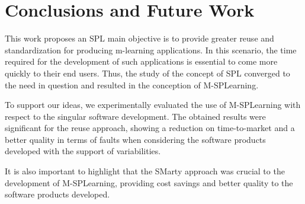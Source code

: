 \section{Conclusions and Future Work}\label{section7}

This work proposes an SPL main objective is to provide greater reuse and standardization for producing m-learning applications.
In this scenario, the time required for the development of such applications is essential to come more quickly to their end users. Thus, the study of the concept of SPL converged to the need in question and resulted in the conception of M-SPLear\allowbreak ning.

To support our ideas, we experimentally evaluated the use of M-SPLear\allowbreak ning with respect to the singular software development. The obtained results were significant for the reuse approach, showing a reduction on time-to-market and a better quality in terms of faults when considering the software products developed with the support of variabilities. 

It is also important to highlight that the SMarty approach was crucial to the development of M-SPLear\allowbreak ning, providing cost savings and better quality to the software products developed.

